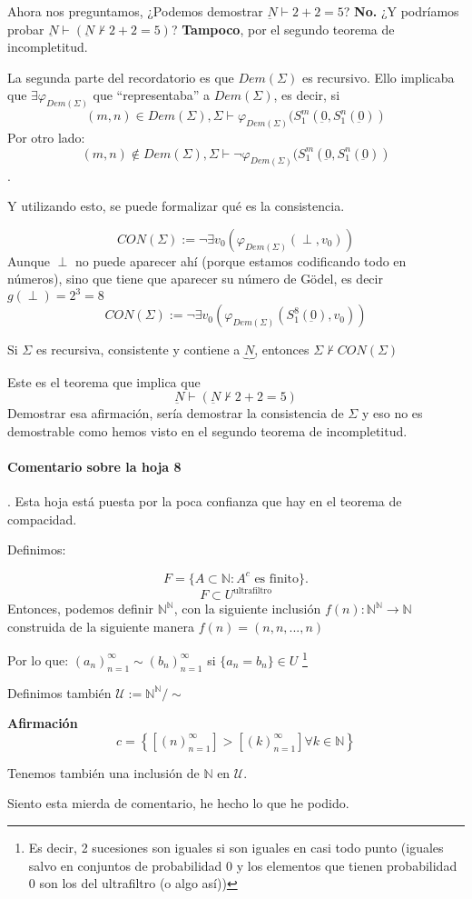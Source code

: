 Ahora nos preguntamos, ¿Podemos demostrar $\underbar{N} \vdash 2+2 = 5$? \textbf{No.}
%
¿Y podríamos probar $\underbar{N} \vdash \left( \underbar{N} \not \vdash 2+2=5 \right)$?
\textbf{Tampoco}, por el segundo teorema de incompletitud.

La segunda parte del recordatorio es que $Dem(Σ)$ es recursivo. Ello implicaba que $\exists φ_{Dem(Σ)}$ que ``representaba'' a $Dem(Σ)$, es decir, si $$(m,n) \in Dem(Σ), Σ\vdash φ_{Dem(Σ)}(S_1^m(\underbar{0},S_1^n(\underbar{0}))$$
Por otro lado: $$(m,n) \not \in Dem(Σ), Σ\vdash \neg φ_{Dem(Σ)}(S_1^m(\underbar{0},S_1^n(\underbar{0}))$$.

Y utilizando esto, se puede formalizar qué es la consistencia.

\begin{defn}
\[CON(Σ) := \neg ∃ v_0 \left( φ_{Dem(Σ)}(\perp,v_0) \right)\]
Aunque $\perp$ no puede aparecer ahí (porque estamos codificando todo en números), sino que tiene que aparecer su número de Gödel, es decir $g(\perp) = 2^3 = 8$
\[CON(Σ) := \neg ∃ v_0 \left( φ_{Dem(Σ)}(S_1^8(\underbar{0}),v_0) \right)\]
\end{defn}

\begin{theorem}
Si $Σ$ es recursiva, consistente y contiene a $\underbrace{N}$, entonces $Σ\not\vdash CON(Σ)$
\end{theorem}

Este es el teorema que implica que \[\underbar{N} \vdash \left( \underbar{N} \not \vdash 2+2=5 \right)\]
Demostrar esa afirmación, sería demostrar la consistencia de $Σ$ y eso no es demostrable como hemos visto en el segundo teorema de incompletitud.


\paragraph{Comentario sobre la hoja 8}. Esta hoja está puesta por la poca confianza que hay en el teorema de compacidad.

Definimos:

\[F = \{A\subset ℕ : A^c \text{ es finito}\}.\]
\[F\subset U^{\text{ultrafiltro}}\]
Entonces, podemos definir $ℕ^ℕ$, con la siguiente inclusión $f(n) : ℕ^ℕ \to ℕ$ construida de la siguiente manera $f(n) = (n,n, ... ,n)$

Por lo que: $(a_n)_{n=1}^{∞} \sim (b_n)_{n=1}^{∞}$ si $\{a_n = b_n\} \in U$ \footnote{Es decir, 2 sucesiones son iguales si son iguales en casi todo punto (iguales salvo en conjuntos de probabilidad 0 y los elementos que tienen probabilidad 0 son los del ultrafiltro (o algo así))}

Definimos también $\mathcal{U} := ℕ^ℕ / \sim$

\textbf{Afirmación} \[c = \left\{\left[ (n)_{n=1}^{∞} \right] > \left[ (k)_{n=1}^{∞} \right] ∀k∈ℕ\right\}\]

Tenemos también una inclusión de $ℕ$ en $\mathcal{U}$.

Siento esta mierda de comentario, he hecho lo que he podido.
